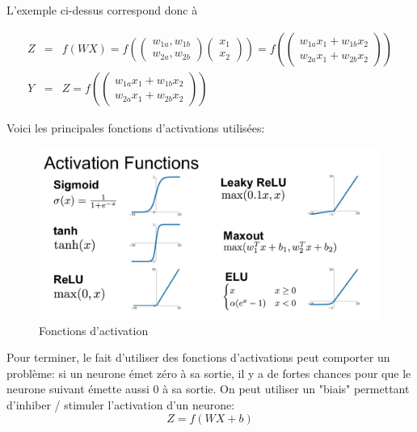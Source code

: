 \documentclass[11pt,a4paper]{report}
\begin{document}
    \par L'exemple ci-dessus correspond donc à 
    
    \begin{eqnarray}
    Z &=& f(WX)  = f\left(\begin{pmatrix} w_{1a} , w_{1b} \\ w_{2a}, w_{2b} \end{pmatrix}\begin{pmatrix} x_1 \\ x_2 \end{pmatrix}\right) = f\left(\begin{pmatrix} w_{1a}x_1 + w_{1b}x_2 \\ w_{2a}x_1+w_{2b}x_2 \end{pmatrix}\right) \\
    Y &=& Z = f\left(\begin{pmatrix} w_{1a}x_1 + w_{1b}x_2 \\ w_{2a}x_1+w_{2b}x_2 \end{pmatrix}\right)
    \end{eqnarray}
    
    \par Voici les principales fonctions d'activations utilisées: 
    
    \begin{figure}[!h]
    \center
    \includegraphics[scale=0.22]{ressources/activation_functions.png}
    \caption{Fonctions d'activation}
    \end{figure} 
    
    \newpage
    \par Pour terminer, le fait d'utiliser des fonctions d'activations peut comporter un problème: si un neurone émet zéro à sa sortie, il y a de fortes chances pour que le neurone suivant émette aussi 0 à sa sortie. On peut utiliser un "biais" permettant d'inhiber / stimuler l'activation d'un neurone: 
    $$Z = f(WX+b)$$
    
\end{document}
